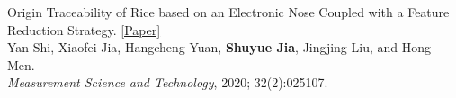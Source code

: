 \documentclass{my_cv}
\begin{document}
\workitemsone
{Origin Traceability of Rice based on an Electronic Nose Coupled with a Feature Reduction Strategy. \href{https://iopscience.iop.org/article/10.1088/1361-6501/abb9e7/meta}{[Paper]} \\
	Yan Shi, Xiaofei Jia, Hangcheng Yuan, \textbf{Shuyue Jia}, Jingjing Liu, and Hong Men.\\
	\emph{Measurement Science and Technology}, 2020; 32(2):025107.}

\hspace*{\fill}

%
%


%
\end{document}
